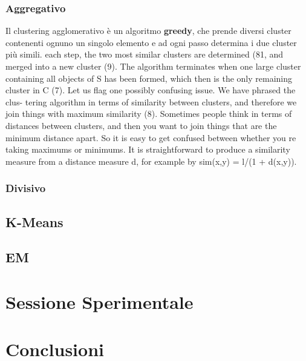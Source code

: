 \documentclass{llncs}
\begin{document}
	\subsubsection{Aggregativo}
	Il clustering agglomerativo è un algoritmo \textbf{greedy}, che prende diversi cluster contenenti ognuno un singolo elemento e ad ogni passo
	determina i due cluster più simili. 
	 each step, the two most similar clusters
	are determined (81, and merged into a new cluster (9). The algorithm
	terminates when one large cluster containing all objects of S has been
	formed, which then is the only remaining cluster in C (7).
	Let us flag one possibly confusing issue. We have phrased the clus-
	tering algorithm in terms of similarity between clusters, and therefore
	we join things with maximum similarity (8). Sometimes people think in
	terms of distances between clusters, and then you want to join things that
	are the minimum distance apart. So it is easy to get confused between
	whether you re taking maximums or minimums. It is straightforward to
	produce a similarity measure from a distance measure d, for example by
	sim(x,y) = l/(1 + d(x,y)).

	\subsubsection{Divisivo}
	\subsection{K-Means}
	\subsection{EM}
    \section{Sessione Sperimentale}
    \section{Conclusioni}
    
\end{document}
